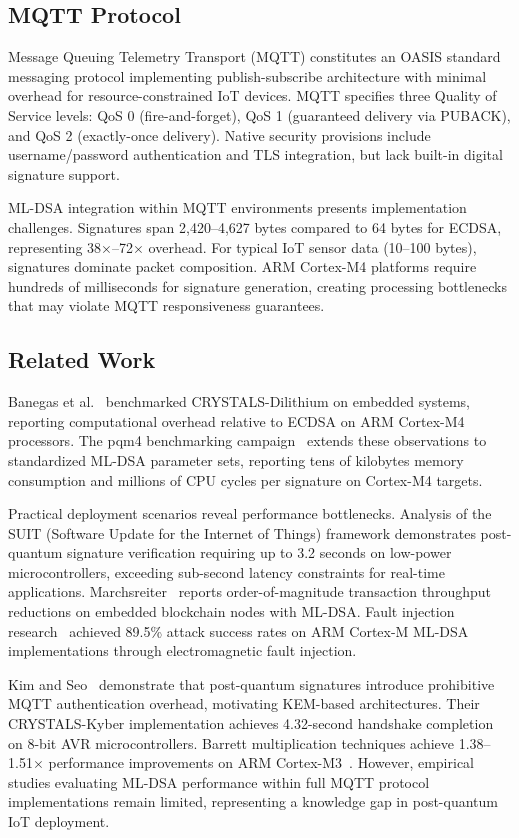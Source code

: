 \documentclass[final, twoside]{IEEEtran} %
\providecommand{\DIFaddend}{} %
\DeclareRobustCommand{\DIFaddend}{\DIFOaddend \let\includegraphics\DIFOincludegraphics} %
\begin{document}
\DIFaddend \subsection{MQTT Protocol}

Message Queuing Telemetry Transport (MQTT) constitutes an OASIS standard messaging protocol implementing publish-subscribe architecture with minimal overhead for resource-constrained IoT devices. MQTT specifies three Quality of Service levels: QoS 0 (fire-and-forget), QoS 1 (guaranteed delivery via PUBACK), and QoS 2 (exactly-once delivery). Native security provisions include username/password authentication and TLS integration, but lack built-in digital signature support.

ML-DSA integration within MQTT environments presents implementation challenges. Signatures span 2,420--4,627 bytes compared to 64 bytes for ECDSA, representing 38$\times$--72$\times$ overhead. For typical IoT sensor data (10--100 bytes), signatures dominate packet composition. ARM Cortex-M4 platforms require hundreds of milliseconds for signature generation, creating processing bottlenecks that may violate MQTT responsiveness guarantees.

\subsection{Related Work}

Banegas et al.~\cite{Banegas2021} benchmarked CRYSTALS-Dilithium on embedded systems, reporting computational overhead relative to ECDSA on ARM Cortex-M4 processors. The pqm4 benchmarking campaign~\cite{pqm4-benchmarks} extends these observations to standardized ML-DSA parameter sets, reporting tens of kilobytes memory consumption and millions of CPU cycles per signature on Cortex-M4 targets.

Practical deployment scenarios reveal performance bottlenecks. Analysis of the SUIT (Software Update for the Internet of Things) framework demonstrates post-quantum signature verification requiring up to 3.2 seconds on low-power microcontrollers, exceeding sub-second latency constraints for real-time applications. Marchsreiter~\cite{Marchsreiter2024} reports order-of-magnitude transaction throughput reductions on embedded blockchain nodes with ML-DSA. Fault injection research~\cite{Li2024} achieved 89.5\% attack success rates on ARM Cortex-M ML-DSA implementations through electromagnetic fault injection.

Kim and Seo~\cite{Kim2025} demonstrate that post-quantum signatures introduce prohibitive MQTT authentication overhead, motivating KEM-based architectures. Their CRYSTALS-Kyber implementation achieves 4.32-second handshake completion on 8-bit AVR microcontrollers. Barrett multiplication techniques achieve 1.38--1.51$\times$ performance improvements on ARM Cortex-M3~\cite{Barrett2023}. However, empirical studies evaluating ML-DSA performance within full MQTT protocol implementations remain limited, representing a knowledge gap in post-quantum IoT deployment.
\end{document}
